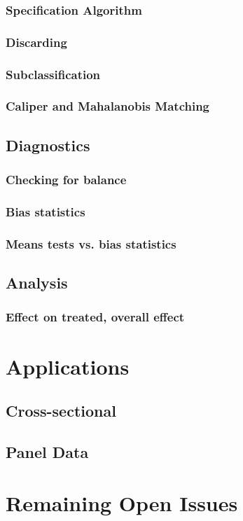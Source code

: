 \documentclass[11pt,titlepage]{article}
\begin{document}
\subsubsection{Specification Algorithm}
\subsubsection{Discarding}
\subsubsection{Subclassification}
\subsubsection{Caliper and Mahalanobis Matching}
\subsection{Diagnostics}
\subsubsection{Checking for balance}
\subsubsection{Bias statistics}
\subsubsection{Means tests vs. bias statistics}
\subsection{Analysis}
\subsubsection{Effect on treated, overall effect}
\section{Applications}
\subsection{Cross-sectional}
\subsection{Panel Data}
\section{Remaining Open Issues}
\end{document}

